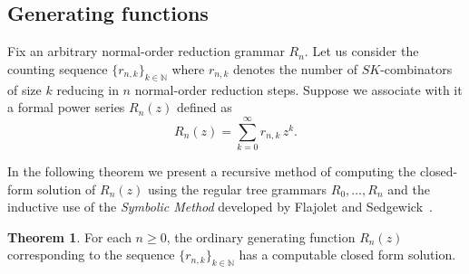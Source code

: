 \documentclass[11pt,a4paper]{amsart}
\theoremstyle{definition}
\newtheorem{theorem}{Theorem}
\begin{document}
\subsection{Generating functions}\label{sec:gen-funs}
Fix an arbitrary normal-order reduction grammar $R_n$. Let us consider the counting sequence $\{r_{n,k}\}_{k\in \mathbb{N}}$ where $r_{n,k}$ denotes the number of $S K$-combinators of size $k$ reducing in $n$ normal-order reduction steps. Suppose we associate with it a formal power series $R_n(z)$ defined as
\[R_n(z) = \sum_{k=0}^{\infty} r_{n,k}\, z^k. \]

In the following theorem we present a recursive method of computing the closed-form solution of $R_n(z)$ using the regular tree grammars $R_0,\ldots,R_n$ and the inductive use of the \emph{Symbolic Method} developed by Flajolet and Sedgewick~\cite{Flajolet:2009:AC:1506267}.

\begin{theorem}
For each $n \geq 0$, the ordinary generating function $R_n(z)$ corresponding to the sequence $\{r_{n,k}\}_{k\in \mathbb{N}}$ has a computable closed form solution.
\end{theorem}
\end{document}
